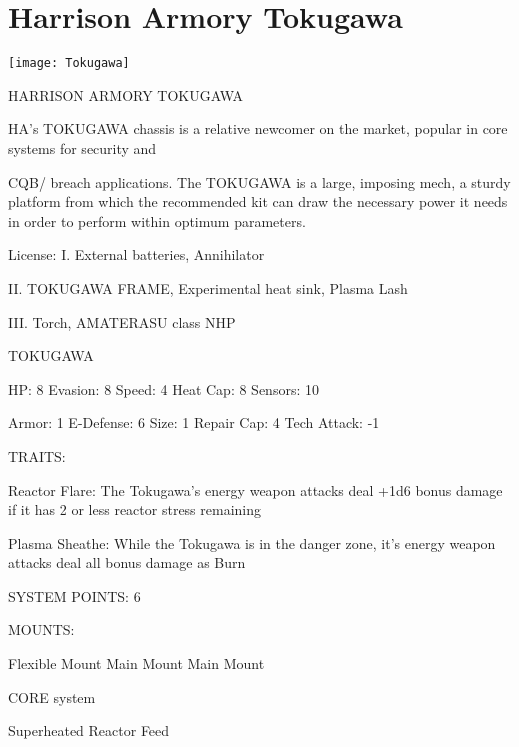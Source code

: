 \section{Harrison Armory Tokugawa}

\begin{center}
    \texttt{[image: Tokugawa]}
\end{center}

                             HARRISON ARMORY TOKUGAWA

HA’s TOKUGAWA chassis is a relative newcomer on the market, popular in core systems for security and

CQB/ breach applications. The TOKUGAWA is a large, imposing mech, a sturdy platform from which the
recommended kit can draw the necessary power it needs in order to perform within optimum parameters.

                                                  License:
I. External batteries, Annihilator

II. TOKUGAWA FRAME, Experimental heat sink, Plasma Lash

III. Torch, AMATERASU class NHP





                                                    TOKUGAWA

  HP: 8            Evasion: 8                              Speed: 4             Heat Cap: 8         Sensors: 10

  Armor: 1         E-Defense: 6                            Size: 1              Repair Cap: 4       Tech Attack: -1

                                                        TRAITS:

  Reactor Flare: The Tokugawa’s energy weapon attacks deal +1d6 bonus damage if it has 2 or less
  reactor stress remaining

  Plasma Sheathe: While the Tokugawa is in the danger zone, it’s energy weapon attacks deal all bonus
  damage as Burn

                                                 SYSTEM POINTS: 6

                                                       MOUNTS:

  Flexible Mount                       Main Mount                               Main Mount

                                                    CORE system

                                             Superheated Reactor Feed

